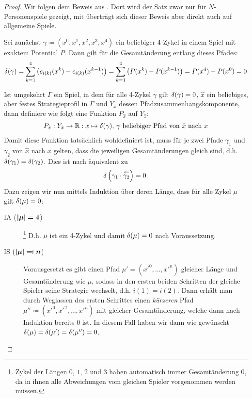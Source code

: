 \begin{proof}
	Wir folgen dem Beweis aus \cite[Anhang A]{MonShap}. Dort wird der Satz zwar nur für $N$-Personenspiele gezeigt, mit  überträgt sich dieser Beweis aber direkt auch auf allgemeine Spiele.
	
	Sei zunächst $\gamma \coloneqq (x^0, x^1, x^2, x^3, x^4)$ ein beliebiger 4-Zykel in einem Spiel mit exaktem Potential $P$. Dann gilt für die Gesamtänderung entlang dieses Pfades:
		\[\delta(\gamma) = \sum_{k=1}^4 \left(c_{i(k)}(x^k) - c_{i(k)}(x^{k-1})\right) = \sum_{k=1}^{4} \left(P(x^k) - P(x^{k-1})\right) = P(x^4) - P(x^0) = 0^{}\]
		
	Ist umgekehrt $\Gamma$ ein Spiel, in dem für alle 4-Zykel $\gamma$ gilt $\delta(\gamma) = 0$, $\hat{x}$ ein beliebiges, aber festes Strategieprofil in $\Gamma$ und $Y_{\hat{x}}$ dessen Pfadzusammenhangskomponente, dann definiere wie folgt eine Funktion $P_{\hat{x}}$ auf $Y_{\hat{x}}$:
		\[P_{\hat{x}}: Y_{\hat{x}} \to \mathbb{R}: x \mapsto \delta(\gamma), \,\gamma \text{ beliebiger Pfad von } \hat{x} \text{ nach } x \]
	Damit diese Funktion tatsächlich wohldefiniert ist, muss für je zwei Pfade $\gamma_1$ und $\gamma_2$ von $\hat{x}$ nach $x$ gelten, dass die jeweiligen Gesamtänderungen gleich sind, d.h. $\delta(\gamma_1) = \delta(\gamma_2)$. Dies ist nach  äquivalent zu
		\[\delta\left(\gamma_1 \cdot \overset{\leftarrow}{\gamma_2}\right) = 0.\]
	Dazu zeigen wir nun mittels Induktion über deren Länge, dass für alle Zykel $\mu$ gilt $\delta(\mu) = 0$:
	\begin{description}
		\item[IA ($\bm{\left|\mu\right|=4}$)]\hspace{-.5em}\footnote{Zykel der Längen $0$, $1$, $2$ und $3$ haben automatisch immer Gesamtänderung $0$, da in ihnen alle Abweichungen vom gleichen Spieler vorgenommen werden müssen.} D.h. $\mu$ ist ein 4-Zykel und damit $\delta(\mu) = 0$ nach Voraussetzung.
		\item[IS ($\bm{\left|\mu\right|\eqqcolon n}$)] Vorausgesetzt es gibt einen Pfad $\mu' = (x'^0, \dots, x'^n)$ gleicher Länge und Gesamtänderung wie $\mu$, sodass in den ersten beiden Schritten der gleiche Spieler seine Strategie wechselt, d.h. $i(1)=i(2)$. Dann erhält man durch Weglassen des ersten Schrittes einen \emph{kürzeren} Pfad $\mu'' \coloneqq (x'^0, x'^2, \dots, x'^n)$ mit gleicher Gesamtänderung, welche dann nach Induktion bereits $0$ ist. In diesem Fall haben wir dann wie gewünscht $\delta(\mu) = \delta(\mu') = \delta(\mu'') = 0$.
		

\end{description}
\end{proof}
